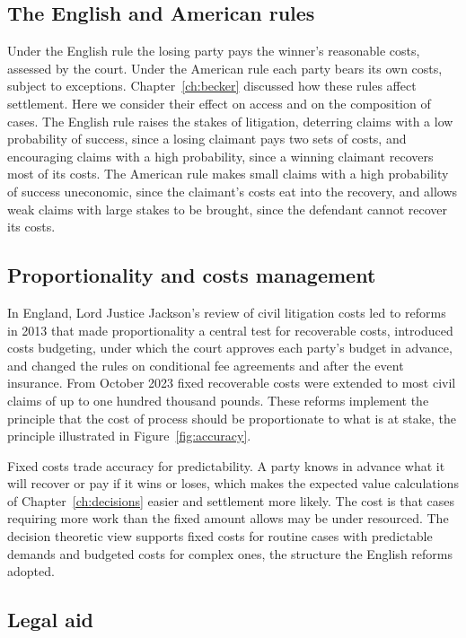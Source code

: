 \subsection{The English and American rules}

Under the English rule the losing party pays the winner's reasonable costs, assessed by the court. Under the American rule each party bears its own costs, subject to exceptions. Chapter~\ref{ch:becker} discussed how these rules affect settlement. Here we consider their effect on access and on the composition of cases. The English rule raises the stakes of litigation, deterring claims with a low probability of success, since a losing claimant pays two sets of costs, and encouraging claims with a high probability, since a winning claimant recovers most of its costs. The American rule makes small claims with a high probability of success uneconomic, since the claimant's costs eat into the recovery, and allows weak claims with large stakes to be brought, since the defendant cannot recover its costs.

\subsection{Proportionality and costs management}

In England, Lord Justice Jackson's review of civil litigation costs led to reforms in 2013 that made proportionality a central test for recoverable costs, introduced costs budgeting, under which the court approves each party's budget in advance, and changed the rules on conditional fee agreements and after the event insurance. From October 2023 fixed recoverable costs were extended to most civil claims of up to one hundred thousand pounds. These reforms implement the principle that the cost of process should be proportionate to what is at stake, the principle illustrated in Figure~\ref{fig:accuracy}.

Fixed costs trade accuracy for predictability. A party knows in advance what it will recover or pay if it wins or loses, which makes the expected value calculations of Chapter~\ref{ch:decisions} easier and settlement more likely. The cost is that cases requiring more work than the fixed amount allows may be under resourced. The decision theoretic view supports fixed costs for routine cases with predictable demands and budgeted costs for complex ones, the structure the English reforms adopted.

\subsection{Legal aid}

